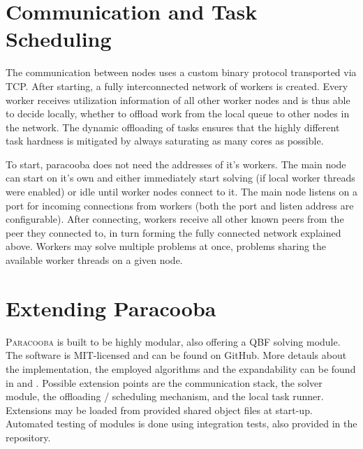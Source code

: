 \documentclass[conference]{IEEEtran}
\newcommand{\paracooba}{\textsc{Paracooba}}
\begin{document}
\section{Communication and Task Scheduling}

The communication between nodes uses a custom binary protocol transported via
TCP. After starting, a fully interconnected network of workers is created.
Every worker receives utilization information of all other worker nodes and is
thus able to decide locally, whether to offload work from the local queue to
other nodes in the network. The dynamic offloading of tasks ensures that the
highly different task hardness is mitigated by always saturating as many cores
as possible.

To start, paracooba does not need the addresses of it's workers. The main node
can start on it's own and either immediately start solving (if local worker
threads were enabled) or idle until worker nodes connect to it. The main node
listens on a port for incoming connections from workers (both the port and
listen address are configurable). After connecting, workers receive all other
known peers from the peer they connected to, in turn forming the fully connected
network explained above.  Workers may solve multiple problems at once, problems
sharing the available worker threads on a given node.

\section{Extending Paracooba}

\paracooba{} is built to be highly modular, also offering a QBF solving module.
The software is MIT-licensed and can be found on GitHub. More detauls about the
implementation, the employed algorithms and the expandability can be found in
\cite{paracooba} and \cite{heisinger2021distributed}. Possible extension points
are the communication stack, the solver module, the offloading / scheduling
mechanism, and the local task runner. Extensions may be loaded from provided
shared object files at start-up. Automated testing of modules is done using
integration tests, also provided in the repository.

\begin{thebibliography}{00}
\end{thebibliography}
\end{document}
